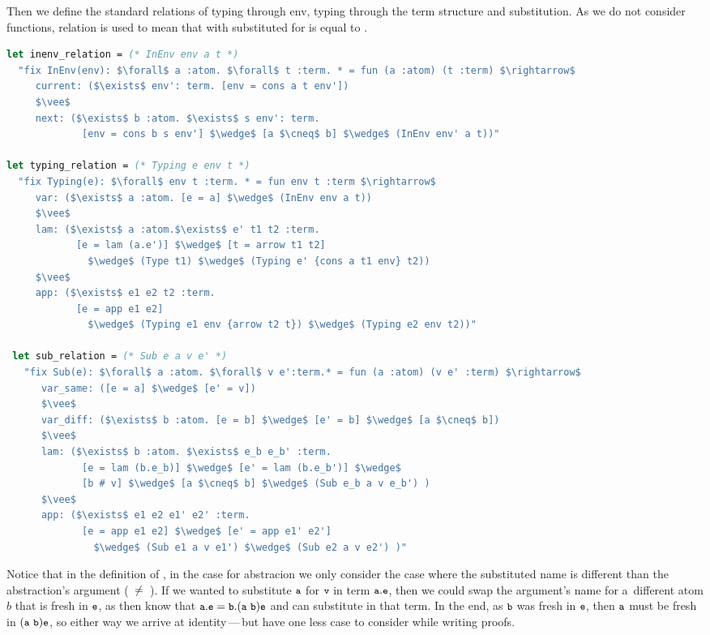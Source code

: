 \documentclass[english, mgr]{iithesis}
\renewcommand{\tt}[1]{\texttt{\small{#1}}}
\newcommand{\lstt}[1]{\text{{\lstinline[columns=fixed,mathescape]|#1|}}}
\newcommand{\mdash}{\,---\,}
\def\-{{\mdash}}
\begin{document}
Then we define the standard relations of typing through env, typing through the term structure
and substitution.
As we do not consider functions, relation \lstt{(Sub e a v e')} is used
to mean that \lstt{e} with \lstt{a} substituted for \lstt{v} is equal to \lstt{e'}.
\begin{lstlisting}[mathescape,language=OCaml, escapebegin=\color{codepurple}]
let inenv_relation = (* InEnv env a t *)
  "fix InEnv(env): $\forall$ a :atom. $\forall$ t :term. * = fun (a :atom) (t :term) $\rightarrow$
     current: ($\exists$ env': term. [env = cons a t env'])
     $\vee$
     next: ($\exists$ b :atom. $\exists$ s env': term.
             [env = cons b s env'] $\wedge$ [a $\cneq$ b] $\wedge$ (InEnv env' a t))"

let typing_relation = (* Typing e env t *)
  "fix Typing(e): $\forall$ env t :term. * = fun env t :term $\rightarrow$
     var: ($\exists$ a :atom. [e = a] $\wedge$ (InEnv env a t))
     $\vee$
     lam: ($\exists$ a :atom.$\exists$ e' t1 t2 :term.
            [e = lam (a.e')] $\wedge$ [t = arrow t1 t2]
              $\wedge$ (Type t1) $\wedge$ (Typing e' {cons a t1 env} t2))
     $\vee$
     app: ($\exists$ e1 e2 t2 :term.
            [e = app e1 e2]
              $\wedge$ (Typing e1 env {arrow t2 t}) $\wedge$ (Typing e2 env t2))"

 let sub_relation = (* Sub e a v e' *)
   "fix Sub(e): $\forall$ a :atom. $\forall$ v e':term.* = fun (a :atom) (v e' :term) $\rightarrow$
      var_same: ([e = a] $\wedge$ [e' = v])
      $\vee$
      var_diff: ($\exists$ b :atom. [e = b] $\wedge$ [e' = b] $\wedge$ [a $\cneq$ b])
      $\vee$
      lam: ($\exists$ b :atom. $\exists$ e_b e_b' :term.
             [e = lam (b.e_b)] $\wedge$ [e' = lam (b.e_b')] $\wedge$
             [b # v] $\wedge$ [a $\cneq$ b] $\wedge$ (Sub e_b a v e_b') )
      $\vee$
      app: ($\exists$ e1 e2 e1' e2' :term.
             [e = app e1 e2] $\wedge$ [e' = app e1' e2']
               $\wedge$ (Sub e1 a v e1') $\wedge$ (Sub e2 a v e2') )"
\end{lstlisting}
Notice that in the definition of \lstt{Sub}, in the case for abstracion we only consider the case where the substituted name is different than the abstraction's argument (\lstt{a}~$\neq$~\lstt{b}).
If we wanted to substitute $\tt{a}$ for $\tt{v}$ in term $\tbind{\tt{a}}\tt{e}$, then we could swap the argument's name for a~different atom $b$ that is fresh in $\tt{e}$, as then know that $\tbind{\tt{a}}\tt{e} \ceq \tbind{\tt{b}}\permswap{\tt{a}}{\tt{b}}\tt{e}$ and can substitute in that term.
In the end, as $\tt{b}$ was fresh in $\tt{e}$, then $\tt{a}$
must be fresh in $\permswap{\tt{a}}{\tt{b}}\tt{e}$, so either way
we arrive at identity\-but have one less case to consider
while writing proofs.
\end{document}
